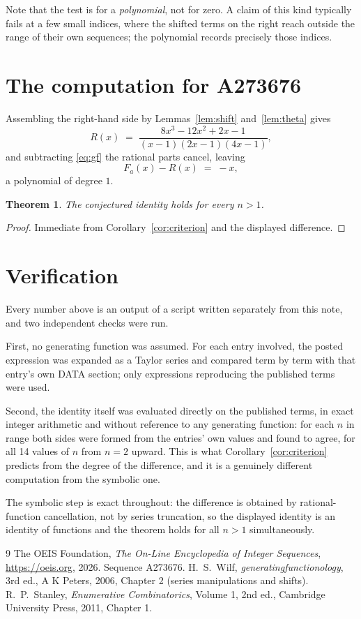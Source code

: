 \documentclass[11pt,a4paper]{article}
\theoremstyle{plain}
\newtheorem{theorem}{Theorem}
\theoremstyle{definition}
\begin{document}
Note that the test is for a \emph{polynomial}, not for zero. A claim of this kind
typically fails at a few small indices, where the shifted terms on the right reach outside
the range of their own sequences; the polynomial records precisely those indices.

\section{The computation for A273676}

Assembling the right-hand side by Lemmas~\ref{lem:shift} and~\ref{lem:theta} gives
\[
R(x)\;=\;\frac{8 x^{3} - 12 x^{2} + 2 x - 1}{\left(x - 1\right) \left(2 x - 1\right) \left(4 x - 1\right)} ,
\]
and subtracting \eqref{eq:gf} the rational parts cancel, leaving
\[
F_{a}(x)-R(x)\;=\;- x ,
\]
a polynomial of degree $1$.

\begin{theorem}
The conjectured identity holds for every $n>1$.
\end{theorem}

\begin{proof}
Immediate from Corollary~\ref{cor:criterion} and the displayed difference.
\end{proof}

\section{Verification}

Every number above is an output of a script written separately from this note, and two
independent checks were run.

First, no generating function was assumed. For each entry involved, the posted expression
was expanded as a Taylor series and compared term by term with that entry's own DATA
section; only expressions reproducing the published terms were used.

Second, the identity itself was evaluated directly on the published terms, in exact
integer arithmetic and without reference to any generating function: for each $n$ in range
both sides were formed from the entries' own values and found to agree, for all 14
values of $n$ from $n=2$ upward. This is what Corollary~\ref{cor:criterion}
predicts from the degree of the difference, and it is a genuinely different computation
from the symbolic one.

The symbolic step is exact throughout: the difference is obtained by rational-function
cancellation, not by series truncation, so the displayed identity is an identity of
functions and the theorem holds for all $n>1$ simultaneously.

\begin{thebibliography}{9}
 The OEIS Foundation, \emph{The On-Line Encyclopedia of Integer Sequences},
\url{https://oeis.org}, 2026. Sequence A273676.
 H.~S.~Wilf, \emph{generatingfunctionology}, 3rd ed., A K Peters, 2006,
Chapter 2 (series manipulations and shifts).
 R.~P.~Stanley, \emph{Enumerative Combinatorics}, Volume 1, 2nd ed.,
Cambridge University Press, 2011, Chapter 1.
\end{thebibliography}
\end{document}
